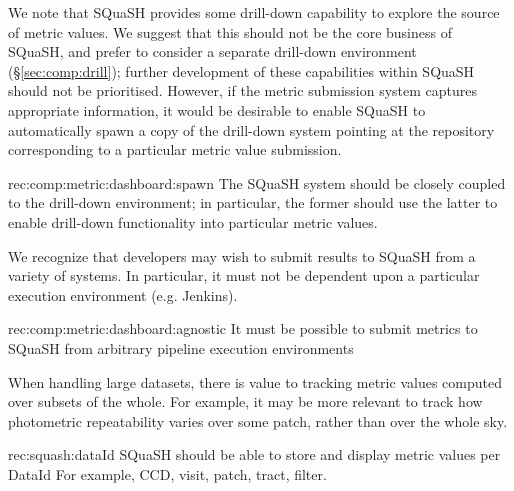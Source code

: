 We note that SQuaSH provides some drill-down capability to explore the source of metric values.
We suggest that this should not be the core business of SQuaSH, and prefer to consider a separate drill-down environment (\S\ref{sec:comp:drill}); further development of these capabilities within SQuaSH should not be prioritised.
However, if the metric submission system captures appropriate information, it would be desirable to enable SQuaSH to automatically spawn a copy of the drill-down system pointing at the repository corresponding to a particular metric value submission.

\begin{recommendation}
  {rec:comp:metric:dashboard:spawn}
  {The SQuaSH system should be closely coupled to the drill-down environment; in particular, the former should use the latter to enable drill-down functionality into particular metric values.}
\end{recommendation}

We recognize that developers may wish to submit results to SQuaSH from a variety of systems.
In particular, it must not be dependent upon a particular execution environment (e.g. Jenkins).

\begin{recommendation}
    {rec:comp:metric:dashboard:agnostic}
    {It must be possible to submit metrics to SQuaSH from arbitrary pipeline execution environments}
\end{recommendation}

When handling large datasets, there is value to tracking metric values computed over subsets of the whole.
For example, it may be more relevant to track how photometric repeatability varies over some patch, rather than over the whole sky.

\begin{recommendation}
    {rec:squash:dataId}
    {SQuaSH should be able to store and display metric values per DataId}
    For example, CCD, visit, patch, tract, filter.
\end{recommendation}
